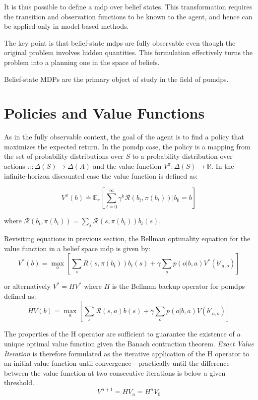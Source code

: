 It is thus possible to define a \gls{mdp} over belief states. 
This transformation requires the transition and observation functions to be known
to the agent, and hence can be applied only in model-based methods.

The key point is that belief-state \glspl{mdp} are fully
observable even though the original problem involves hidden quantities. This
formulation effectively turns the problem into a planning one in the space of beliefs.

Belief-state MDPs are the primary object of study in the field of \glspl{pomdp}.

\section{Policies and Value Functions}
As in the fully observable context, the goal of the agent is to find a policy that maximizes the expected 
return. In the \gls{pomdp} case, the policy is a mapping from the set of probability distributions 
over $S$ to a probability distribution over actions $\pi : \Delta(S) \rightarrow \Delta(A)$ 
and the value function $V^{\pi} : \Delta(S) \rightarrow \mathbb{R}$. 
In the infinite-horizon discounted case the value function is defined as:

$$V^{\pi}(b) \doteq \mathbb{E}_{\pi}\left[ \sum ^\infty _{t=0} \gamma^k \mathcal{R}(b_t,\pi(b_t)) | b_0 = b  \right]$$

where $\mathcal{R}(b_t,\pi(b_t)) = \sum_s \mathcal{R}(s,\pi(b_t))b_t(s)$.


Revisiting equations in previous section, the Bellman optimality equation for the value function 
in a belief space \gls{mdp} is given by:
$$V^* (b) = \max_a \left[\sum_s R(s,\pi(b_t))b_t(s) + \gamma\sum_o p(o|b,a) V^*(b'_{a,o}) \right]$$

or alternatively $V^* = HV^*$ where $H$ is the Bellman backup operator for \gls{pomdp}s defined as:
$$H V(b) = \max_a \left[\sum_s \mathcal{R}(s,a)b(s) + \gamma\sum_o p(o|b,a) V(b'_{a,o}) \right]$$

The properties of the H operator are sufficient to guarantee the existence of a unique optimal value 
function given the Banach contraction theorem. \textit{Exact Value Iteration} is therefore formulated 
as the iterative application of the H operator to an initial value function until convergence - practically 
until the difference between the value function at two consecutive iterations is below a given threshold.
$$V^{n+1} = HV_n = H^n V_0$$ 


